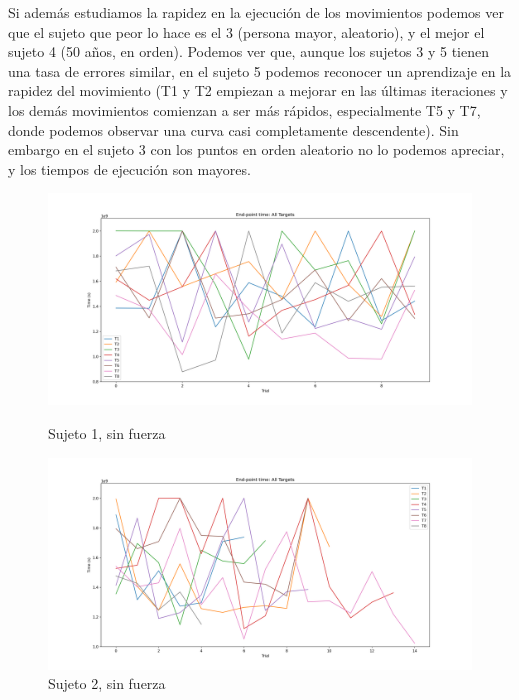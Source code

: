 \documentclass[a4paper,11pt, oneside]{book}
\begin{document}
Si además estudiamos la rapidez en la ejecución de los movimientos podemos ver que el sujeto que peor lo hace es el 3 (persona mayor, aleatorio), y el mejor el sujeto 4 (50 años, en orden). Podemos ver que, aunque los sujetos 3 y 5 tienen una tasa de errores similar, en el sujeto 5 podemos reconocer un aprendizaje en la rapidez del movimiento (T1 y T2 empiezan a mejorar en las últimas iteraciones y los demás movimientos comienzan a ser más rápidos, especialmente T5 y T7, donde podemos observar una curva casi completamente descendente). Sin embargo en el sujeto 	3 con los puntos en orden aleatorio no lo podemos apreciar, y los tiempos de ejecución son mayores.

\begin{figure}[h]
	\begin{minipage}[b]{0.5\linewidth}
		\centering
		\includegraphics[width=\linewidth]{sujeto1/no_force/evolution_time}
		\caption{Sujeto 1, sin fuerza}
		\label{fig:figura1}
	\end{minipage}
	\hspace{0.5cm}
	\begin{minipage}[b]{0.5\linewidth}
		\centering
		\includegraphics[width=\linewidth]{sujeto2/no_force/evolution_time}
		\caption{Sujeto 2, sin fuerza}
		\label{fig:figura2}
	\end{minipage}
\end{figure}
\end{document}
